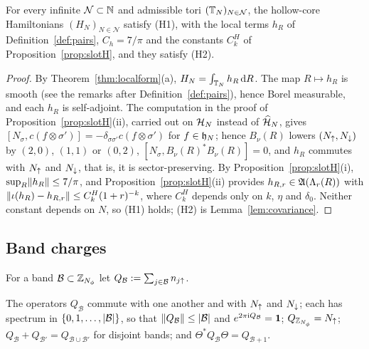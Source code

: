 \begin{corollary}\label{cor:hc-in-class}
For every infinite $\mathcal N\subset\mathbb{N}$ and admissible tori $(\mathbb{T}_N)_{N\in\mathcal N}$, the hollow-core Hamiltonians
$(H_N)_{N\in\mathcal N}$ satisfy (H1), with the local terms $h_R$ of Definition~\ref{def:pairs}, $C_h=7/\pi$ and the
constants $C^H_k$ of Proposition~\ref{prop:slotH}, and they satisfy (H2).
\end{corollary}

\begin{proof}
By Theorem~\ref{thm:localform}(a), $H_N=\int_{\mathbb{T}_N}h_R\,\mathrm{d} R$. The map $R\mapsto h_R$ is smooth (see the remarks after
Definition~\ref{def:pairs}), hence Borel measurable, and each $h_R$ is self-adjoint. The computation in the proof of
Proposition~\ref{prop:slotH}(ii), carried out on $\mathcal{H}_N$ instead of $\widehat{\mathcal{H}}_N$, gives
$[N_\sigma,c(f\otimes\sigma')]=-\delta_{\sigma\sigma'}c(f\otimes\sigma')$ for $f\in\mathfrak{h}_N$; hence $B_\nu(R)$ lowers
$(N_{\uparrow},N_{\downarrow})$ by $(2,0)$, $(1,1)$ or $(0,2)$, $[N_\sigma,B_\nu(R)^*B_\nu(R)]=0$, and $h_R$ commutes with $N_{\uparrow}$ and $N_{\downarrow}$,
that is, it is sector-preserving. By Proposition~\ref{prop:slotH}(i), $\sup_R\lVert h_R\rVert\le7/\pi$, and
Proposition~\ref{prop:slotH}(ii) provides $h_{R,r}\in\mathfrak{A}(\Lambda_{r}(R))$ with $\lVert\iota(h_R)-h_{R,r}\rVert\le C^H_k(1+r)^{-k}$,
where $C^H_k$ depends only on $k$, $\eta$ and $\delta_0$. Neither constant depends on $N$, so (H1) holds; (H2) is
Lemma~\ref{lem:covariance}.
\end{proof}

\subsection{Band charges}

\begin{definition}\label{def:charges}
For a band $\mathcal B\subset\mathbb{Z}_{N_{\phi}}$ let $Q_{\mathcal B}:=\sum_{j\in\mathcal B}n_{j{\uparrow}}$.
\end{definition}

\begin{lemma}\label{lem:charges-elementary}
The operators $Q_{\mathcal B}$ commute with one another and with $N_{\uparrow}$ and $N_{\downarrow}$; each has spectrum in
$\{0,1,\dots,\lvert\mathcal B\rvert\}$, so that $\lVert Q_{\mathcal B}\rVert\le\lvert\mathcal B\rvert$ and $e^{2\pi\mathrm{i} Q_{\mathcal B}}=\mathbf{1}$;
$Q_{\mathbb{Z}_{N_{\phi}}}=N_{\uparrow}$; $Q_{\mathcal B}+Q_{\mathcal B'}=Q_{\mathcal B\cup\mathcal B'}$ for disjoint bands; and
$\Theta^*Q_{\mathcal B}\Theta=Q_{\mathcal B+1}$.
\end{lemma}

